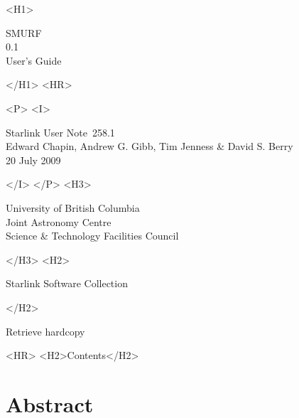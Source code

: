 \documentclass[twoside,11pt]{article}
\newcommand{\stardoccategory}  {Starlink User Note}
\newcommand{\stardocsource}    {sun\stardocnumber}
\newcommand{\stardocnumber}    {258.1}
\newcommand{\stardocauthors}   {Edward Chapin, Andrew G. Gibb, Tim Jenness \& David S. Berry}
\newcommand{\stardocdate}      {20 July 2009}
\newcommand{\stardoctitle}     {SMURF}
\newcommand{\stardocversion}   {0.1}
\newcommand{\stardocmanual}    {User's Guide}
\newcommand{\htmladdnormallink}[2]{#1}
\newcommand{\htmladdimg}[1]{}
\newcommand{\htmlref}[2]{#1}
\newcommand{\htmladdtonavigation}[1]{}
\newcommand{\xlabel}[1]{}
\renewcommand{\_}{\texttt{\symbol{95}}}
\begin{document}
\begin{htmlonly}
   \xlabel{}
   \begin{rawhtml} <H1> \end{rawhtml}
      \stardoctitle\\
      \stardocversion\\
      \stardocmanual
   \begin{rawhtml} </H1> <HR> \end{rawhtml}


   \begin{rawhtml} <P> <I> \end{rawhtml}
   \stardoccategory\ \stardocnumber \\
   \stardocauthors \\
   \stardocdate
   \begin{rawhtml} </I> </P> <H3> \end{rawhtml}
      \htmladdnormallink{University of British Columbia}
                        {http://www.ubc.ca} \\
      \htmladdnormallink{Joint Astronomy Centre}
                        {http://www.jach.hawaii.edu}\\
      \htmladdnormallink{Science \& Technology Facilities Council}
                        {http://www.pparc.ac.uk} \\
   \begin{rawhtml} </H3> <H2> \end{rawhtml}
      \htmladdnormallink{Starlink Software Collection}{http://starlink.jach.hawaii.edu/}
   \begin{rawhtml} </H2> \end{rawhtml}
   \htmladdnormallink{\htmladdimg{source.gif} Retrieve hardcopy}
      {http://starlink.jach.hawaii.edu/cgi-bin/hcserver?\stardocsource}\\

  \label{stardoccontents}
  \begin{rawhtml} 
    <HR>
    <H2>Contents</H2>
  \end{rawhtml}
  \htmladdtonavigation{\htmlref{\htmladdimg{contents_motif.gif}}
        {stardoccontents}}

  \section{\xlabel{abstract}Abstract}
\end{htmlonly}
\end{document}
